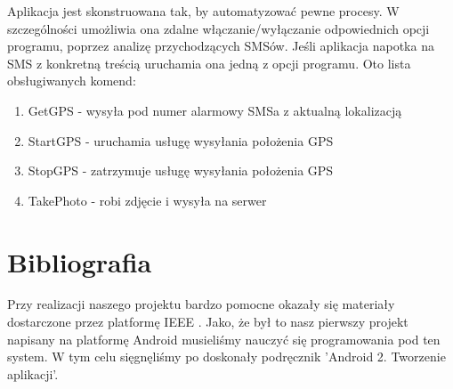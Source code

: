 \documentclass[11pt,a4paper]{article}
\begin{document}
\vspace{10pt}
Aplikacja jest skonstruowana tak, by automatyzować pewne procesy. W szczególności umożliwia ona zdalne włączanie/wyłączanie odpowiednich opcji programu, poprzez analizę przychodzących SMSów. Jeśli aplikacja napotka na SMS z konkretną treścią uruchamia ona jedną z opcji programu. Oto lista obsługiwanych komend:
\begin{enumerate}
\item GetGPS - wysyła pod numer alarmowy SMSa z aktualną lokalizacją 
\item StartGPS - uruchamia usługę wysyłania położenia GPS
\item StopGPS - zatrzymuje usługę wysyłania położenia GPS
\item TakePhoto - robi zdjęcie i wysyła na serwer
\end{enumerate}
\newpage
\section{Bibliografia}
Przy realizacji naszego projektu bardzo pomocne okazały się materiały dostarczone przez platformę IEEE
\cite{2009UltraDeponti}
\cite{2010ComputingEttinger}
\cite{2011IEEEIntGoldman}
\cite{2011IEEERadioMitchell}
\cite{2009IEEEEngineeringSposaro}
\cite{2011DroidColunas}
\cite{2010IEEEEMBCDoukas}
\cite{2010IEEEEMBCSposaro}
\cite{2009IEEEBIBEWang}
\cite{2010NISSYang}.
Jako, że był to nasz pierwszy projekt napisany na platformę Android musieliśmy nauczyć się programowania pod ten system. W tym celu sięgnęliśmy po doskonały podręcznik 'Android 2. Tworzenie aplikacji'\cite{2010AndroidHashimi}.



\end{document}
